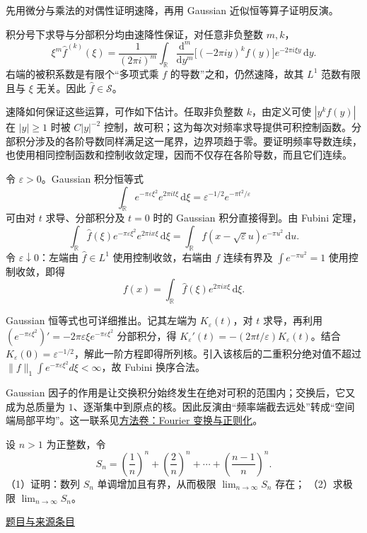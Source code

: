 \documentclass[UTF8,12pt,a4paper,fontset=fandol]{ctexart}
\begin{document}
\begin{solve}\label{ans:fin08-hi:7}

先用微分与乘法的对偶性证明速降，再用 Gaussian 近似恒等算子证明反演。

积分号下求导与分部积分均由速降性保证，对任意非负整数 $m,k$，
\[
\xi^m\widehat f^{(k)}(\xi)=\frac1{(2\pi i)^m}\int_{\mathbb R}
\frac{\mathrm d^m}{\mathrm dy^m}\bigl[(-2\pi iy)^kf(y)\bigr]e^{-2\pi i\xi y}\,\mathrm dy.
\]
右端的被积系数是有限个“多项式乘 $f$ 的导数”之和，仍然速降，故其 $L^1$ 范数有限且与 $\xi$ 无关。因此 $\widehat f\in\mathcal S$。

速降如何保证这些运算，可作如下估计。任取非负整数 $k$，由定义可使 $|y^kf(y)|$ 在 $|y|\ge1$ 时被 $C|y|^{-2}$ 控制，故可积；这为每次对频率求导提供可积控制函数。分部积分涉及的各阶导数同样满足这一尾界，边界项趋于零。要证明频率导数连续，也使用相同控制函数和控制收敛定理，因而不仅存在各阶导数，而且它们连续。

令 $\varepsilon>0$。Gaussian 积分恒等式
\[
\int_{\mathbb R}e^{-\pi\varepsilon\xi^2}e^{2\pi it\xi}\,\mathrm d\xi
=\varepsilon^{-1/2}e^{-\pi t^2/\varepsilon}
\]
可由对 $t$ 求导、分部积分及 $t=0$ 时的 Gaussian 积分直接得到。由 Fubini 定理，
\[
\int_{\mathbb R}\widehat f(\xi)e^{-\pi\varepsilon\xi^2}e^{2\pi ix\xi}\,\mathrm d\xi
=\int_{\mathbb R}f(x-\sqrt\varepsilon u)e^{-\pi u^2}\,\mathrm du.
\]
令 $\varepsilon\downarrow0$：左端由 $\widehat f\in L^1$ 使用控制收敛，右端由 $f$ 连续有界及 $\int e^{-\pi u^2}=1$ 使用控制收敛，即得
\[
f(x)=\int_{\mathbb R}\widehat f(\xi)e^{2\pi ix\xi}\,\mathrm d\xi.
\]

Gaussian 恒等式也可详细推出。记其左端为 $K_\varepsilon(t)$，对 $t$ 求导，再利用 $(e^{-\pi\varepsilon\xi^2})'=-2\pi\varepsilon\xi e^{-\pi\varepsilon\xi^2}$ 分部积分，得 $K_\varepsilon'(t)=-(2\pi t/\varepsilon)K_\varepsilon(t)$。结合 $K_\varepsilon(0)=\varepsilon^{-1/2}$，解此一阶方程即得所列核。引入该核后的二重积分绝对值不超过 $\|f\|_1\int e^{-\pi\varepsilon\xi^2}d\xi<\infty$，故 Fubini 换序合法。

\end{solve}

\begin{remark}[方法与条件]Gaussian 因子的作用是让交换积分始终发生在绝对可积的范围内；交换后，它又成为总质量为 $1$、逐渐集中到原点的核。因此反演由“频率端截去远处”转成“空间端局部平均”。这一联系见\hyperref[app:integration-fourier]{方法卷：Fourier 变换与正则化}。\end{remark}

\begin{example}\label{ex:fin08-lo:8}\label{pr:fin08-lo:8}

设 $n>1$ 为正整数，令
\[
S_{n}=\left(\frac{1}{n}\right)^{n}+\left(\frac{2}{n}\right)^{n}+\cdots+\left(\frac{n-1}{n}\right)^{n}.
\]
（1）证明：数列 $S_{n}$ 单调增加且有界，从而极限 $\lim_{n\to\infty}S_{n}$ 存在；
（2）求极限 $\lim_{n\to\infty}S_{n}$。

\par\href{https://github.com/lzxcr/cmc-mathematics/blob/64916fa1fdbc3e444a652eca204d5669058ee321/src/problems/finals/08/08.md}{题目与来源条目}

\end{example}
\end{document}
